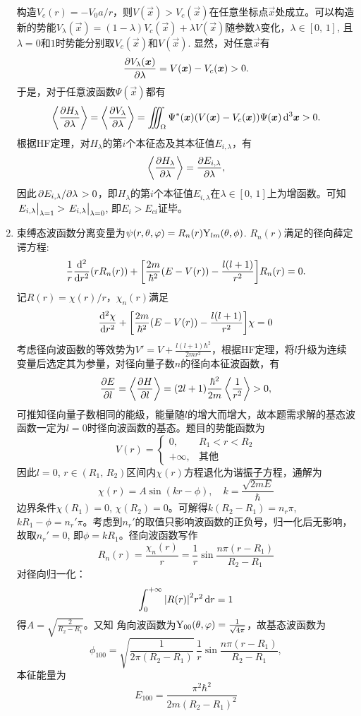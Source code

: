 \begin{enumerate}[label=\textbf{5.\arabic*}, listparindent=\parindent, leftmargin=-0.5mm]
构造$V_c(r) = -V_0 a/r$，则$V(\vec{x})>V_c(\vec{x})$在任意坐标点$\vec{x}$处成立。可以构造新的势能$V_{\lambda}(\vec{x}) = (1-\lambda) V_c(\vec{x}) + \lambda V(\vec{x})$随参数$\lambda$变化，$\lambda\in[0,\,1]$, 且$\lambda=0$和$1$时势能分别取$V_c(\vec{x})$和$V(\vec{x})$. 显然，对任意$\vec{x}$有
\[\pdv{V_\lambda(\boldsymbol{x})}{\lambda} = V(\boldsymbol{x})-V_c(\boldsymbol{x})>0.\]
于是，对于任意波函数$\Psi(\vec{x})$都有
\[\left\langle \pdv{H_\lambda}{\lambda}\right\rangle = \left\langle \pdv{V_\lambda}{\lambda}\right\rangle = \iiint_\Omega \Psi^*(\boldsymbol{x})\qty(V(\boldsymbol{x})-V_c(\boldsymbol{x}))\Psi(\boldsymbol{x})\dd[3]{\boldsymbol{x}}>0.\]
根据HF定理，对$H_\lambda$的第$i$个本征态及其本征值$E_{i,\lambda}$，有
\[\left\langle \pdv{H_\lambda}{\lambda}\right\rangle = \pdv{E_{i,\lambda}}{\lambda},\]
因此$\pdv*{E_{i,\lambda}}{\lambda}>0$，即$H_{\lambda}$的第$i$个本征值$E_{i,\lambda}$在$\lambda\in [0,\,1]$上为增函数。可知$\eval{E_{i,\lambda}}_{\lambda=1}>\eval{E_{i,\lambda}}_{\lambda=0}$, 即$E_i>E_{ci} $证毕。

\item 束缚态波函数分离变量为$\psi(r,\theta,\varphi)=R_n(r)\mathrm{Y}_{lm}(\theta,\phi)$. $R_n(r)$满足的径向薛定谔方程:
\[\frac{1}{r}\dv[2]{r}\qty(rR_n(r)) + \qty[\frac{2m}{\hbar^2}(E-V(r))-\frac{l(l+1)}{r^2}]R_n(r) = 0.\]
记$R(r)=\chi(r)/r$，$\chi_n(r)$满足
\[\dv[2]{\chi}{r}+\qty[\frac{2m}{\hbar^2}(E-V(r))-\frac{l(l+1)}{r^2}]\chi = 0\]
考虑径向波函数的等效势为$V'=V+\frac{l(l+1)\hbar^2}{2mr^2}$，根据HF定理，将$l$升级为连续变量后选定其为参量，对径向量子数$n$的径向本征波函数，有
\[\pdv{E}{l}=\left\langle\pdv{H}{l}\right\rangle = (2l+1)\frac{\hbar^2}{2m}\left\langle\frac{1}{r^2}\right\rangle>0,\] 可推知径向量子数相同的能级，能量随$l$的增大而增大，故本题需求解的基态波函数一定为$l=0$时径向波函数的基态。题目的势能函数为
\[V(r) = \begin{cases}0, & R_1<r<R_2\\
+\infty, &\text{其他}
\end{cases}\]
因此$l=0$, $r\in(R_1,\,R_2)$区间内$\chi(r)$方程退化为谐振子方程，通解为
\[\chi(r) = A\sin(kr-\phi),\quad k=\frac{\sqrt{2mE}}{\hbar}\]
边界条件$\chi(R_1)=0$, $\chi(R_2)=0$。可解得$k(R_2-R_1)=n_r\pi$, $kR_1-\phi=n_r'\pi$。考虑到$n_r'$的取值只影响波函数的正负号，归一化后无影响，故取$n_r'=0$, 即$\phi=kR_1$。径向波函数写作
\[R_n(r) = \frac{\chi_n(r)}{r} = \frac{1}{r}\sin\frac{n\pi (r-R_1)}{R_2-R_1}\]
对径向归一化：
\[\int_0^{+\infty} \abs{R(r)}^2r^2\dd{r} = 1\]
得$A=\sqrt{\frac{2}{R_2-R_1}}$。又知
角向波函数为$\mathrm{Y}_{00}(\theta,\varphi)=\frac{1}{\sqrt{4\pi}}$，故基态波函数为
\[\phi_{100}=\sqrt{\frac{1}{2\pi(R_2-R_1)}}\,\frac{1}{r}\sin\frac{n\pi(r-R_1)}{R_2-R_1},\]
本征能量为
\[E_{100} = \frac{\pi^2\hbar^2}{2m(R_2-R_1)^2}\]


\end{enumerate}
